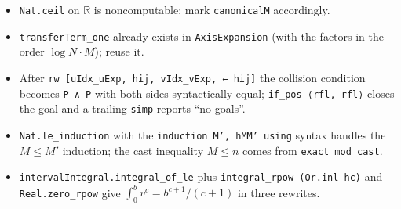 \documentclass[11pt]{article}
\begin{document}
\begin{itemize}
\item \texttt{Nat.ceil} on $\mathbb R$ is noncomputable: mark \texttt{canonicalM} accordingly.
\item \texttt{transferTerm\_one} already exists in \texttt{AxisExpansion} (with the factors in the
order $\log N\cdot M$); reuse it.
\item After \texttt{rw [uIdx\_uExp, hij, vIdx\_vExp, ← hij]} the collision condition becomes
\texttt{P ∧ P} with both sides syntactically equal; \texttt{if\_pos ⟨rfl, rfl⟩} closes the goal and a
trailing \texttt{simp} reports ``no goals''.
\item \texttt{Nat.le\_induction} with the \texttt{induction M', hMM' using} syntax handles the
$M\le M'$ induction; the cast inequality $M\le n$ comes from \texttt{exact\_mod\_cast}.
\item \texttt{intervalIntegral.integral\_of\_le} plus \texttt{integral\_rpow (Or.inl hc)} and
\texttt{Real.zero\_rpow} give $\int_0^bv^c=b^{c+1}/(c+1)$ in three rewrites.
\end{itemize}
\end{document}
